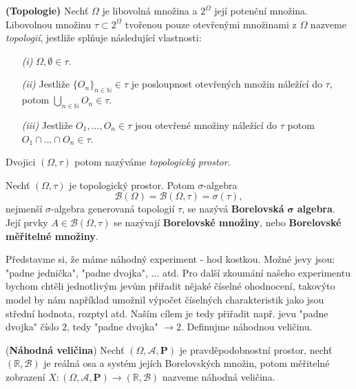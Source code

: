 \begin{definition}\textbf{(Topologie)}
Nechť $ \Omega $ je libovolná množina a $ 2^{\Omega} $ její potenční množina. Libovolnou množinu $\tau \subset 2^{\Omega} $ tvořenou pouze otevřenými množinami z $\Omega$ nazveme \textit{topologií}, jestliže splňuje následující vlastnosti:
\begin{itemize}
\item[\textit{(i)}] $ \Omega, \emptyset \in \tau $.
\item[\textit{(ii)}] Jestliže $\lbrace O_{n} \rbrace_{n \in \mathbb{N}} \in \tau$ je posloupnost otevřených množin náležící do $ \tau$, potom $\bigcup_{n \in \mathbb{N}}O_{n} \in \tau$.
\item[\textit{(iii)}] Jestliže $O_{1}, ..., O_{n} \in \tau $ jsou otevřené množiny náležící do $\tau$ potom $O_{1}\cap ...\cap O_{n} \in \tau$.
\end{itemize}
Dvojici $(\Omega, \tau)$ potom nazýváme \textit{topologický prostor}.
\end{definition}


\begin{definition}
Nechť $(\Omega, \tau)$ je topologický prostor. Potom $\sigma$-algebra $$\mathcal{B}(\Omega)=\mathcal{B}(\Omega,\tau) = \sigma(\tau),$$ nejmenší $\sigma$-algebra generovaná topologií $\tau$, se nazývá \textbf{Borelovská} $\bm{\sigma}$ \textbf{algebra}. Její prvky $A \in \mathcal{B}(\Omega, \tau)$ se nazývají \textbf{Borelovské množiny}, nebo \textbf{Borelovské měřitelné množiny}.
\end{definition}

Představme si, že máme náhodný experiment - hod kostkou. Možné jevy jsou: "padne jednička", "padne dvojka", ... atd. Pro další zkoumání našeho experimentu bychom chtěli jednotlivým jevům přiřadit nějaké číselné ohodnocení, takovýto model by nám například umožnil výpočet číselných charakteristik jako jsou střední hodnota, rozptyl atd. Naším cílem je tedy přiřadit např. jevu "padne dvojka" číslo $2$, tedy "padne dvojka" $\longrightarrow 2$. Definujme náhodnou veličinu.
\begin{definition}{(\textbf{Náhodná veličina})}
Nechť $( \Omega, \mathcal{A}, \textbf{P}) $ je pravděpodobnostní prostor, nechť $(\mathbb{R}, \mathcal{B})$ je reálná osa a systém jejích Borelovských množin, potom měřitelné zobrazení $X: (\Omega, \mathcal{A}, \textbf{P}) \longrightarrow (\mathbb{R}, \mathcal{B}) $ nazveme náhodná veličina.
\end{definition}


